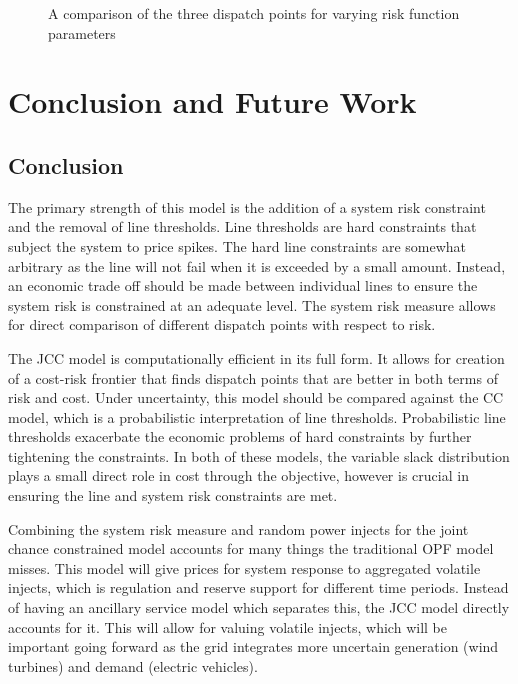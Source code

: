\begin{figure}
\centering

\caption{A comparison of the three dispatch points for varying risk function parameters}\label{figsense}
\end{figure}






\section{Conclusion and Future Work}

\subsection{Conclusion}
The primary strength of this model is the addition of a system risk constraint and the removal of line thresholds. Line thresholds are hard constraints that subject the system to price spikes.  The hard line constraints are somewhat arbitrary as the line will not fail when it is exceeded by a small amount.  Instead, an economic trade off should be made between individual lines to ensure the system risk is constrained at an adequate level.  The system risk measure allows for direct comparison of different dispatch points with respect to risk.

The JCC model is computationally efficient in its full form.  It allows for creation of a cost-risk frontier that finds dispatch points that are better in both terms of risk and cost.  Under uncertainty, this model should be compared against the CC model, which is a probabilistic interpretation of line thresholds.  Probabilistic line thresholds exacerbate the economic problems of hard constraints by further tightening the constraints.  In both of these models, the variable slack distribution plays a small direct role in cost through the objective, however is crucial in ensuring the line and system risk constraints are met.  
  
Combining the system risk measure and random power injects for the joint chance constrained model accounts for many things the traditional OPF model misses.  This model will give prices for system response to aggregated volatile injects, which is regulation and reserve support for different time periods.  Instead of having an ancillary service model which separates this, the JCC model directly accounts for it.  This will allow for valuing volatile injects, which will be important going forward as the grid integrates more uncertain generation (wind turbines) and demand (electric vehicles).

